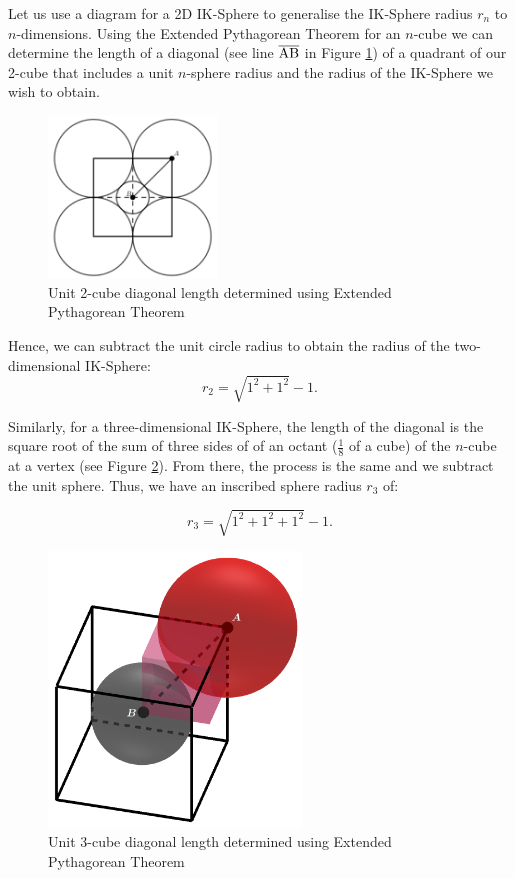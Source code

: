 Let us use a diagram for a 2D IK-Sphere to generalise the IK-Sphere radius $r_n$ to $n$-dimensions. Using the Extended Pythagorean Theorem for an $n$-cube we can determine the length of a diagonal (see line $\overline{\rm AB}$ in Figure \ref{fig:2d diagonal}) of a quadrant of our 2-cube that includes a unit $n$-sphere radius and the radius of the IK-Sphere we wish to obtain. 
\begin{figure}[h]
    \centering
    \includegraphics[width=0.4\textwidth]{images/diagonal 2d.png}
    \caption{\label{fig:2d diagonal}Unit 2-cube diagonal length determined using Extended Pythagorean Theorem}
\end{figure}

\noindent Hence, we can subtract the unit circle radius to obtain the radius of the two-dimensional IK-Sphere: $$r_2 = \sqrt{1^2+1^2}-1.$$  %

Similarly, for a three-dimensional IK-Sphere, the length of the diagonal is the square root of the sum of three sides of of an octant ($\frac{1}{8}$ of a cube) of the $n$-cube at a vertex (see Figure \ref{fig:3d diagonal}). From there, the process is the same and we subtract the unit sphere. Thus, we have an inscribed sphere radius $r_3$ of: 

\begin{equation*}
    r_3=\sqrt{1^2+1^2+1^2}-1.
\end{equation*}

\begin{figure}[H]
    \centering
    \includegraphics[width=0.6\textwidth]{images/3d diagonal.png}
    \caption{\label{fig:3d diagonal}Unit 3-cube diagonal length determined using Extended Pythagorean Theorem}
\end{figure}

